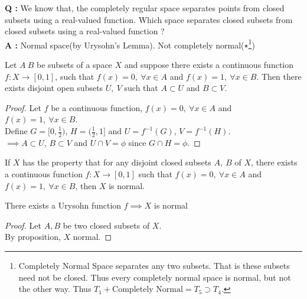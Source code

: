 \begin{commentary}
\noindent \textbf{Q :} We know that, the completely regular space separates points from closed subsets using a real-valued function.
	Which space separates closed subsets from closed subsets using a real-valued function ?\\
\textbf{A :} Normal space(by Urysohn's Lemma).
	Not completely normal($\star$\footnote{Completely Normal Space separates any two subsets.
	\cite[chapter 7 Exer. 1.11]{joshi} That is these subsets need not be closed.
	Thus every completely normal space is normal, but not the other way.
	Thus $T_1 + \text{Completely Normal} = T_5 \supset T_4$.})
\end{commentary}

\begin{proposition}
	Let $A\ B$ be subsets of a space $X$ and suppose there exists a continuous function $f:X \to [0,1]$, such that $f(x)=0,\ \forall x \in A$ and $f(x)=1,\ \forall x \in B$.
	Then there exists disjoint open subsets $U,\ V$ such that $A \subset U$ and $B \subset V$.
\end{proposition}
\begin{proof}
	Let $f$ be a continuous function, $f(x) = 0,\ \forall x \in A$ and $f(x) = 1,\ \forall x \in B$.\\
	Define $G = [0,\frac{1}{2})$, $H = (\frac{1}{2},1]$ and $U = f^{-1}(G)$, $V = f^{-1}(H)$.\\
	$\implies A \subset U$, $B \subset V$ and $U \cap V = \phi$ since $G \cap H = \phi$.
\end{proof}

\begin{corollary}
	If $X$ has the property that for any disjoint closed subsets $A,\ B$ of $X$, there exists a continuous function $f : X \to [0,1]$ such that $f(x)=0,\ \forall x \in A$ and $f(x)=1,\ \forall x \in B$, then $X$ is normal.
\end{corollary}
\begin{commentary}
	There exists a Urysohn function $f \implies X$ is normal
\end{commentary}
\begin{proof}
	Let $A,B$ be two closed subsets of $X$.\\
	By proposition, $X$ normal.
\end{proof}

